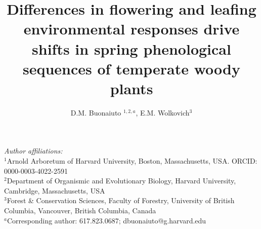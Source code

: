 \documentclass[12pt]{article}\usepackage[]{graphicx}\usepackage[]{color}
\title{Differences in flowering and leafing environmental responses drive shifts in spring phenological sequences of temperate woody plants}
\date{}
\author{D.M. Buonaiuto $^{1,2,a}$, E.M. Wolkovich$^{3}$}
\begin{document}
\maketitle
\noindent \emph{Author affiliations:}\\
\noindent $^1$Arnold Arboretum of Harvard University, Boston, Massachusetts, USA. ORCID: 0000-0003-4022-2591\\
$^2$Department of Organismic and Evolutionary Biology, Harvard University, Cambridge, Massachusetts, USA \\
$^3$Forest \& Conservation Sciences, Faculty of Forestry, University of British Columbia, Vancouver, British Columbia, Canada\\
$^a$Corresponding author: 617.823.0687; dbuonaiuto@g.harvard.edu\\
\pagebreak


\maketitle
\linenumbers
\end{document}
